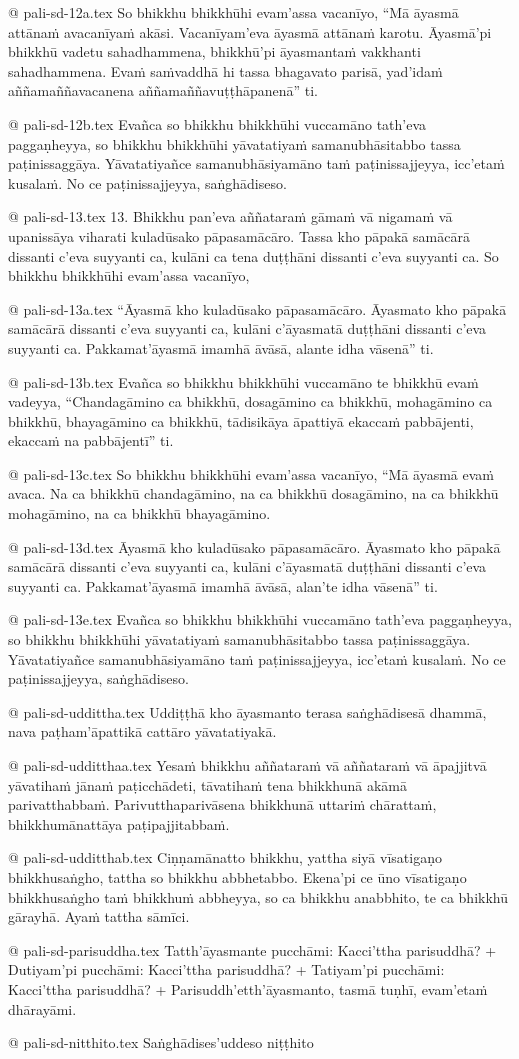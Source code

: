 @ pali-sd-12a.tex
So bhikkhu bhikkhūhi evam’assa vacanīyo, “Mā āyasmā attānaṁ avacanīyaṁ akāsi. Vacanīyam’eva āyasmā attānaṁ karotu. Āyasmā’pi bhikkhū vadetu sahadhammena, bhikkhū’pi āyasmantaṁ vakkhanti sahadhammena. Evaṁ saṁvaddhā hi tassa bhagavato parisā, yad’idaṁ aññamaññavacanena aññamaññavuṭṭhāpanenā” ti.

@ pali-sd-12b.tex
Evañca so bhikkhu bhikkhūhi vuccamāno tath’eva paggaṇheyya, so bhikkhu bhikkhūhi yāvatatiyaṁ samanubhāsitabbo tassa paṭinissaggāya. Yāvatatiyañce samanubhāsiyamāno taṁ paṭinissajjeyya, icc’etaṁ kusalaṁ. No ce paṭinissajjeyya, saṅghādiseso.

@ pali-sd-13.tex
13. Bhikkhu pan’eva aññataraṁ gāmaṁ vā nigamaṁ vā upanissāya viharati kuladūsako pāpasamācāro. Tassa kho pāpakā samācārā dissanti c’eva suyyanti ca, kulāni ca tena duṭṭhāni dissanti c’eva suyyanti ca. So bhikkhu bhikkhūhi evam’assa vacanīyo,

@ pali-sd-13a.tex
“Āyasmā kho kuladūsako pāpasamācāro. Āyasmato kho pāpakā samācārā dissanti c’eva suyyanti ca, kulāni c’āyasmatā duṭṭhāni dissanti c’eva suyyanti ca. Pakkamat’āyasmā imamhā āvāsā, alante idha vāsenā” ti.

@ pali-sd-13b.tex
Evañca so bhikkhu bhikkhūhi vuccamāno te bhikkhū evaṁ vadeyya, “Chandagāmino ca bhikkhū, dosagāmino ca bhikkhū, mohagāmino ca bhikkhū, bhayagāmino ca bhikkhū, tādisikāya āpattiyā ekaccaṁ pabbājenti, ekaccaṁ na pabbājentī” ti.

@ pali-sd-13c.tex
So bhikkhu bhikkhūhi evam’assa vacanīyo, “Mā āyasmā evaṁ avaca. Na ca bhikkhū chandagāmino, na ca bhikkhū dosagāmino, na ca bhikkhū mohagāmino, na ca bhikkhū bhayagāmino.

@ pali-sd-13d.tex
Āyasmā kho kuladūsako pāpasamācāro. Āyasmato kho pāpakā samācārā dissanti c’eva suyyanti ca, kulāni c’āyasmatā duṭṭhāni dissanti c’eva suyyanti ca. Pakkamat’āyasmā imamhā āvāsā, alan’te idha vāsenā” ti.

@ pali-sd-13e.tex
Evañca so bhikkhu bhikkhūhi vuccamāno tath’eva paggaṇheyya, so bhikkhu bhikkhūhi yāvatatiyaṁ samanubhāsitabbo tassa paṭinissaggāya. Yāvatatiyañce samanubhāsiyamāno taṁ paṭinissajjeyya, icc’etaṁ kusalaṁ. No ce paṭinissajjeyya, saṅghādiseso.

@ pali-sd-uddittha.tex
Uddiṭṭhā kho āyasmanto terasa saṅghādisesā dhammā, nava paṭham’āpattikā cattāro yāvatatiyakā.

@ pali-sd-udditthaa.tex
Yesaṁ bhikkhu aññataraṁ vā aññataraṁ vā āpajjitvā yāvatihaṁ jānaṁ paṭicchādeti, tāvatihaṁ tena bhikkhunā akāmā parivatthabbaṁ. Parivutthaparivāsena bhikkhunā uttariṁ chārattaṁ, bhikkhumānattāya paṭipajjitabbaṁ.

@ pali-sd-udditthab.tex
Ciṇṇamānatto bhikkhu, yattha siyā vīsatigaṇo bhikkhusaṅgho, tattha so bhikkhu abbhetabbo. Ekena’pi ce ūno vīsatigaṇo bhikkhusaṅgho taṁ bhikkhuṁ abbheyya, so ca bhikkhu anabbhito, te ca bhikkhū gārayhā. Ayaṁ tattha sāmīci.

@ pali-sd-parisuddha.tex
Tatth’āyasmante pucchāmi: Kacci’ttha parisuddhā? +
Dutiyam’pi pucchāmi: Kacci’ttha parisuddhā? +
Tatiyam’pi pucchāmi: Kacci’ttha parisuddhā? +
Parisuddh’etth’āyasmanto, tasmā tuṇhī, evam’etaṁ dhārayāmi.

@ pali-sd-nitthito.tex
Saṅghādises’uddeso niṭṭhito
